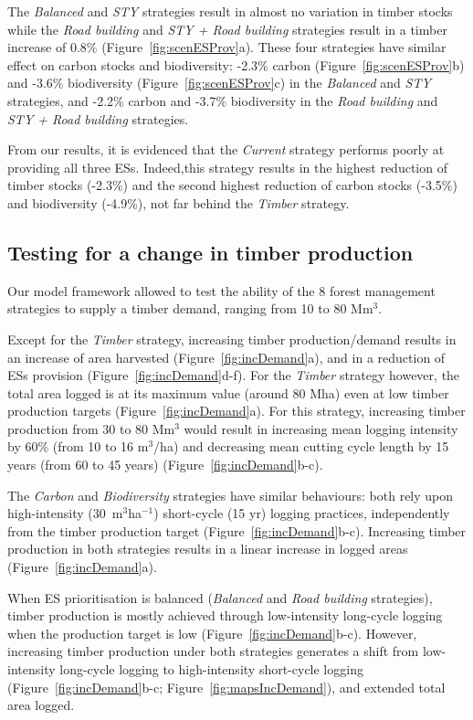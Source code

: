\documentclass{article}
\begin{document}
The \textit{Balanced} and \textit{STY} strategies result in almost no variation in timber stocks while the \textit{Road building} and \textit{STY + Road building} strategies result in a timber increase of 0.8\% (Figure~\ref{fig:scenESProv}a). These four strategies have similar effect on carbon stocks and biodiversity: -2.3\% carbon (Figure~\ref{fig:scenESProv}b) and -3.6\% biodiversity (Figure~\ref{fig:scenESProv}c) in the \textit{Balanced} and \textit{STY} strategies, and -2.2\% carbon and -3.7\% biodiversity in the \textit{Road building} and \textit{STY + Road building} strategies. 

From our results, it is evidenced that the \textit{Current} strategy performs poorly at providing all three ESs. Indeed,this strategy results in the highest reduction of timber stocks (-2.3\%) and the second highest reduction of carbon stocks (-3.5\%) and biodiversity (-4.9\%), not far behind the \textit{Timber} strategy. 

\subsection{Testing for a change in timber production}

Our model framework allowed to test the ability of the 8 forest management strategies to supply a timber demand, ranging from 10 to 80 Mm$^3$.

Except for the \textit{Timber} strategy, increasing timber production/demand results in an increase of area harvested (Figure~\ref{fig:incDemand}a), and in a reduction of ESs provision (Figure~\ref{fig:incDemand}d-f).
For the \textit{Timber} strategy however, the total area logged is at its maximum value (around 80 Mha) even at low timber production targets (Figure~\ref{fig:incDemand}a). For this strategy, increasing timber production from 30 to 80 Mm$^3$ would result in increasing mean logging intensity by 60\% (from 10 to 16 m$^3$/ha) and decreasing mean cutting cycle length by 15 years (from 60 to 45 years) (Figure~\ref{fig:incDemand}b-c). 

The \textit{Carbon} and \textit{Biodiversity} strategies have similar behaviours: both rely upon high-intensity (30~m$^3$ha$^{-1}$) short-cycle (15 yr) logging practices, independently from the timber production target (Figure~\ref{fig:incDemand}b-c). Increasing timber production in both strategies results in a linear increase in logged areas (Figure~\ref{fig:incDemand}a). 

When ES prioritisation is balanced (\textit{Balanced} and \textit{Road building} strategies), timber production is mostly achieved through low-intensity long-cycle logging when the production target is low (Figure~\ref{fig:incDemand}b-c). However, increasing timber production under both strategies generates a shift from low-intensity long-cycle logging to high-intensity short-cycle logging (Figure~\ref{fig:incDemand}b-c; Figure~\ref{fig:mapsIncDemand}), and extended total area logged. 
\end{document}
